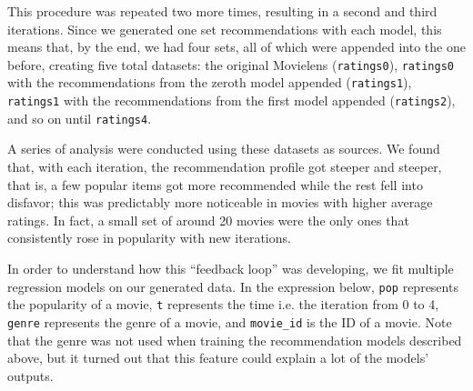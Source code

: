This procedure was repeated two more times, resulting in a second and third
iterations. Since we generated one set recommendations with each model, this
means that, by the end, we had four sets, all of which were appended into the
one before, creating five total datasets: the original Movielens
(\verb|ratings0|), \verb|ratings0| with the recommendations from the zeroth
model appended (\verb|ratings1|), \verb|ratings1| with the recommendations from
the first model appended (\verb|ratings2|), and so on until \verb|ratings4|.

A series of analysis were conducted using these datasets as sources. We found
that, with each iteration, the recommendation profile got steeper and steeper,
that is, a few popular items got more recommended while the rest fell into
disfavor; this was predictably more noticeable in movies with higher average
ratings. In fact, a small set of around 20 movies were the only ones that
consistently rose in popularity with new iterations.

In order to understand how this ``feedback loop'' was developing, we fit
multiple regression models on our generated data. In the expression below,
\verb|pop| represents the popularity of a movie, \verb|t| represents the time
i.e. the iteration from 0 to 4, \verb|genre| represents the genre of a movie,
and \verb|movie_id| is the ID of a movie. Note that the genre was not used when
training the recommendation models described above, but it turned out that this
feature could explain a lot of the models' outputs.

